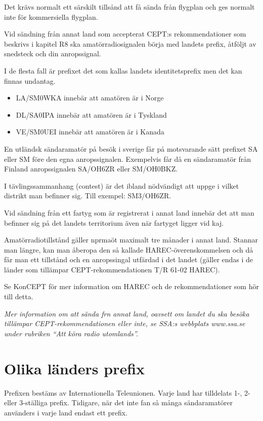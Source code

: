 Det krävs normalt ett särskilt tillsånd att få sända från flygplan och
ges normalt inte för kommersiella flygplan.

Vid sändning från annat land som accepterat CEPT:s rekommendationer
som beskrivs i kapitel R8 ska amatörradiosignalen börja med landets
prefix, åtföljt av snedsteck och din anropssignal.

I de flesta fall är prefixet det som kallas landets identitetsprefix
men det kan finnas undantag.

\begin{itemize}
\item LA/SM0WKA innebär att amatören är i Norge
\item DL/SA0IPA innebär att amatören är i Tyskland
\item VE/SM0UEI innebär att amatören är i Kanada
\end{itemize}

En utländsk sändaramatör på besök i sverige får på motsvarande sätt
prefixet SA eller SM före den egna anropssignalen. Exempelvis får då
en sändaramatör från Finland anropssignalen SA/OH6ZR eller SM/OH0BKZ.

I tävlingssammanhang (contest) är det ibland nödvändigt att uppge i
vilket distrikt man befinner sig. Till exempel: SM3/OH6ZR.

Vid sändning från ett fartyg som är registrerat i annat land innebär
det att man befinner sig på det landets territorium även när fartyget
ligger vid kaj.

Amatörradiotillstånd gäller nprmaöt maximalt tre månader i annat land.
Stannar man längre, kan man åberopa den så kallade
HAREC-överenskommelsen och då får man ett tillstånd och en
anropssingal utfärdad i det landet (gäller endas i de länder som
tillämpar CEPT-rekommendationen T/R 61-02 HAREC).

Se KonCEPT för mer information om HAREC och de rekommendationer som
hör till detta.

\emph{Mer information om att sända frn annat land, oavsett om landet
  du ska besöka tillämpar CEPT-re\-kom\-men\-da\-tio\-n\-en eller inte, se SSA:s
  webbplats www.ssa.se under rubriken ``Att köra radio utomlands''.}

\section{Olika länders prefix}

Prefixen bestäms av Internationella Teleunionen. Varje land har
tilldelats 1-, 2- eller 3-ställiga prefix. Tidigare, när det inte fan
så många sändaramatörer använders i varje land endast ett prefix.

